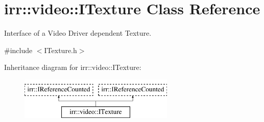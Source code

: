 \hypertarget{classirr_1_1video_1_1ITexture}{}\section{irr\+:\+:video\+:\+:I\+Texture Class Reference}
\label{classirr_1_1video_1_1ITexture}


Interface of a Video Driver dependent Texture.  




{\ttfamily \#include $<$I\+Texture.\+h$>$}

Inheritance diagram for irr\+:\+:video\+:\+:I\+Texture\+:\begin{figure}[H]
\begin{center}
\leavevmode
\includegraphics[height=2.000000cm]{classirr_1_1video_1_1ITexture}
\end{center}
\end{figure}
